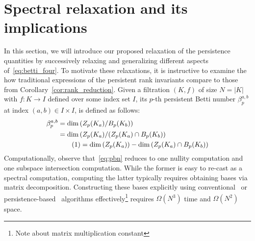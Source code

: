\documentclass[10pt]{article}
\numberwithin{equation}{section}
\newcommand{\+}{%
	\raisebox{0.18ex}{\scaleobj{0.55}{+}}
}
\theoremstyle{definition}
\theoremstyle{definition}
\newcommand\numberthis{\addtocounter{equation}{1}\tag{\theequation}}
\begin{document}
\section{Spectral relaxation and its implications}\label{sec:spectral_sec}
In this section, we will introduce our proposed relaxation of the persistence quantities by successively relaxing and generalizing different aspects of~\eqref{eq:betti_four}. To motivate these relaxations, it is instructive to examine the how traditional expressions of the persistent rank invariants compare to  those from Corollary~\ref{cor:rank_reduction}. 
Given a filtration $(K,f)$ of size $N = \lvert K\rvert$ with $f: K \to I$ defined over some index set $I$, its $p$-th persistent Betti number $\beta_p^{a,b}$ at index $(a,b) \in I \times I$, is defined as follows: 
\begin{align*} \label{eq:pbn}
	\centering
	\beta_p^{a,b } &= \mathrm{dim} \left ( Z_p(K_a) / B_p(K_b) \right ) \\
	& = \mathrm{dim} \left( Z_p(K_a) / (Z_p(K_a) \cap B_p(K_b) \right) \\
	& \numberthis = \mathrm{dim} \left( Z_p(K_a) \right) - \mathrm{dim}\left( Z_p(K_a) \cap B_p(K_b) \right ) 
\end{align*}
Computationally, observe that~\eqref{eq:pbn} reduces to one nullity computation and one subspace intersection computation. %
While the former is easy to re-cast as a spectral computation, computing the latter typically requires obtaining bases via matrix decomposition. Constructing these bases explicitly using conventional~\cite{bhatia2013matrix, golub2013matrix} or persistence-based~\cite{memoli2022persistent, zomorodian2004computing} algorithms effectively\footnote{Note about matrix multiplication constant} requires $\Omega(N^3)$ time and $\Omega(N^2)$ space.
\end{document}

